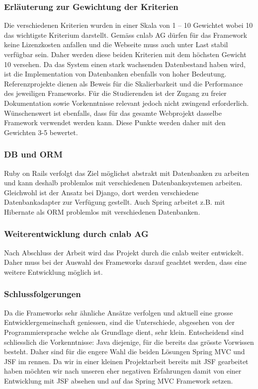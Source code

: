 \subsubsection{Erläuterung zur Gewichtung der Kriterien}
Die verschiedenen Kriterien wurden in einer Skala von 1 – 10 Gewichtet wobei 10 das wichtigste Kriterium darstellt. Gemäss cnlab AG dürfen für das Framework keine Lizenzkosten anfallen und die Webseite muss auch unter Last stabil verfügbar sein. Daher werden diese beiden Kriterien mit dem höchsten Gewicht 10 versehen.
Da das System einen stark wachsenden Datenbestand haben wird, ist die Implementation von Datenbanken ebenfalls von hoher Bedeutung. Referenzprojekte dienen als Beweis für die Skalierbarkeit und die Performance des jeweiligen Frameworks.
Für die Studierenden ist der Zugang zu freier Dokumentation sowie Vorkenntnisse relevant jedoch nicht zwingend erforderlich. Wünschenswert ist ebenfalls, dass für das gesamte Webprojekt dasselbe Framework verwendet werden kann. Diese Punkte werden daher mit den Gewichten 3-5 bewertet.
\subsubsection{DB und ORM}
Ruby on Rails verfolgt das Ziel möglichst abstrakt mit Datenbanken zu arbeiten und kann deshalb problemlos mit verschiedenen Datenbanksystemen arbeiten. Gleichwohl ist der Ansatz bei Django, dort werden verschiedene Datenbankadapter zur Verfügung gestellt. Auch Spring arbeitet z.B. mit Hibernate als ORM problemlos mit verschiedenen Datenbanken.
\subsubsection{Weiterentwicklung durch cnlab AG}
Nach Abschluss der Arbeit wird das Projekt durch die cnlab weiter entwickelt. Daher muss bei der Auswahl des Frameworks darauf geachtet werden, dass eine weitere Entwicklung möglich ist.
\subsubsection{Schlussfolgerungen}
Da die Frameworks sehr ähnliche Ansätze verfolgen und aktuell eine grosse Entwicklergemeinschaft geniessen, sind die Unterschiede, abgesehen von der Programmiersprache welche als Grundlage dient, sehr klein. Entscheidend sind schliesslich die Vorkenntnisse: Java diejenige, für die bereits das grösste Vorwissen besteht. Daher sind für die engere Wahl die beiden Lösungen Spring MVC und JSF im rennen. Da wir in einer kleinen Projektarbeit bereits mit JSF gearbeitet haben möchten wir nach unseren eher negativen  Erfahrungen damit von einer Entwicklung mit JSF absehen und auf das Spring MVC Framework setzen.

